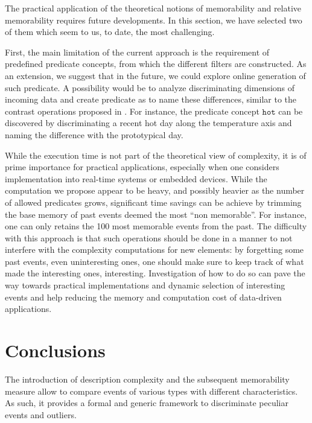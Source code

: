 \documentclass[entropy,article,submit,moreauthors,pdftex]{Definitions/mdpi}
\begin{document}
The practical application of the theoretical notions of memorability and relative memorability requires future developments. In this section, we have selected two of them which seem to us, to date, the most challenging.


First, the main limitation of the current approach is the requirement of
predefined predicate concepts, from which the different filters are constructed.
As an extension, we suggest that in the future, we could explore online
generation of such predicate. A possibility would be to analyze discriminating
dimensions of incoming data and create predicate as to name these differences,
similar to the contrast operations proposed in \cite{dessalles_conceptual_2015,
    gardenfors2004conceptual}. For instance, the predicate concept $\mathtt{hot}$
can be discovered by discriminating a recent hot day along the
temperature axis and naming the difference with the prototypical day.

While the execution time is not part of the theoretical view of complexity, it
is of prime importance for practical applications, especially when one considers
implementation into real-time systems or embedded devices. While the computation
we propose appear to be heavy, and possibly heavier as the number of allowed
predicates grows, significant time savings can be achieve by trimming the base
memory of past events deemed the most ``non memorable''. For instance, one can
only retains the 100 most memorable events from the past. The difficulty with
this approach is that such operations should be done in a manner to not
interfere with the complexity computations for new elements: by forgetting some
past events, even uninteresting ones, one should make sure to keep track of what
made the interesting ones, interesting. Investigation of how to do so can pave
the way towards practical implementations and dynamic selection of interesting
events and help reducing the memory and computation cost of data-driven applications.


\section{Conclusions}
The introduction of description complexity and the subsequent memorability measure allow to compare events of various types with different characteristics. As such, it provides a formal and generic framework to discriminate peculiar events and outliers.
\end{document}
